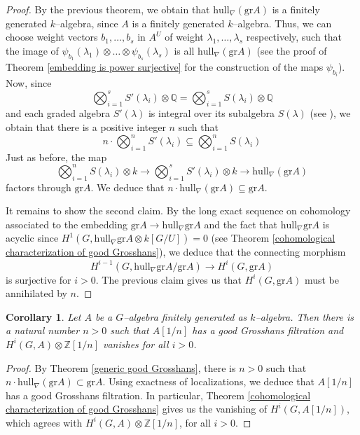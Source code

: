 \documentclass{article}
\theoremstyle{plain}
\newtheorem{Cor}[Th]{Corollary}
\theoremstyle{definition}
\begin{document}
\begin{proof}
   By the previous theorem, we obtain that  $\mathrm{hull}_\nabla(\mathrm{gr} A)$ is a finitely generated $k$--algebra, since $A$ is a finitely generated $k$--algebra. Thus, we can choose weight vectors $b_1,\ldots,b_s$ in $A^U$ of weight $\lambda_1,\ldots,\lambda_s$ respectively, such that  the image of $\psi_{b_1}(\lambda_1)\otimes\ldots\otimes \psi_{b_s}(\lambda_s)$ is all $\mathrm{hull}_\nabla(\mathrm{gr} A)$  (see the proof of Theorem \ref{embedding is power surjective} for the construction of the maps $\psi_{b_i}$). Now, since 
   \[
   \bigotimes_{i=1}^s S'(\lambda_i)\otimes \mathbb{Q}=\bigotimes_{i=1}^s S(\lambda_i)\otimes \mathbb{Q}
   \]
   and each graded algebra $S'(\lambda)$ is integral over its subalgebra $S(\lambda)$ (see  \cite[Lemma 37]{FvdK10}), we obtain that there is a positive integer $n$ such that 
   \[
   n\cdot\bigotimes_{i=1}^n S'(\lambda_i)\subseteq \bigotimes_{i=1}^n S(\lambda_i)
   \]
   Just as before, the map 
   \[
   \bigotimes_{i=1}^n S(\lambda_i)\otimes k \to \bigotimes_{i=1}^s S'(\lambda_i)\otimes k\to \mathrm{hull}_\nabla(\mathrm{gr}A)
   \]
   factors through $\mathrm{gr} A $. We deduce that $n\cdot \mathrm{hull}_\nabla(\mathrm{gr}A)\subseteq \mathrm{gr}A$. 

   It remains to show the second claim.  By the long exact sequence on cohomology associated to the embedding $\mathrm{gr}A\to \mathrm{hull}_\nabla\mathrm{gr}A$ and the fact that $\mathrm{hull}_\nabla\mathrm{gr}A$ is acyclic since $H^1(G,\mathrm{hull}_\nabla\mathrm{gr}A\otimes k[G/U])=0$ (see Theorem \ref{cohomological characterization of good Grosshans}), we deduce that the connecting morphism 
   \[
   H^{i-1}(G,\mathrm{hull}_\nabla\mathrm{gr}A/\mathrm{gr}A)\to H^i(G,\mathrm{gr}A)
   \]
   is surjective for $i>0$. The previous claim gives us that $H^i(G,\mathrm{gr}A)$ must be annihilated by $n$. 
\end{proof}

\begin{Cor}\label{Cor: A1/m is acyclic for some m}
    Let $A$ be a $G$--algebra finitely generated as $k$--algebra. Then there is a natural number $n>0$ such that $A[1/n]$ has a good Grosshans filtration and $H^i(G,A)\otimes \mathbb{Z}[1/n]$ vanishes for all $i>0$.
\end{Cor}

\begin{proof}
    By Theorem \ref{generic good Grosshans}, there is $n>0$ such that $n\cdot \mathrm{hull}_\nabla(\mathrm{gr}A)\subset \mathrm{gr}A$. Using exactness of localizations, we  deduce that $A[1/n]$ has a good Grosshans filtration. In particular, Theorem \ref{cohomological characterization of good Grosshans} gives us the vanishing of $H^i(G,A[1/n])$, which agrees with $H^i(G,A)\otimes \mathbb{Z}[1/n]$, for all $i>0$.  
\end{proof}
\end{document}
